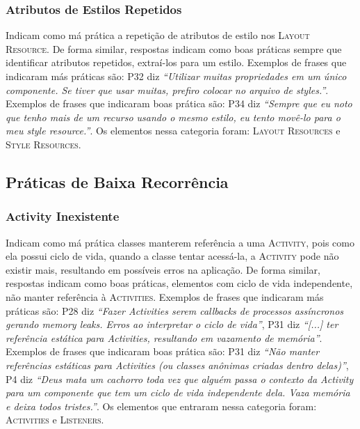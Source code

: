 \subsubsection{Atributos de Estilos Repetidos}
Indicam como má prática a repetição de atributos de estilo nos \textsc{Layout Resource}. De forma similar, respostas indicam como boas práticas sempre que identificar atributos repetidos, extraí-los para um estilo. Exemplos de frases que indicaram más práticas são: P32 diz \textit{``Utilizar muitas propriedades em um único componente. Se tiver que usar muitas, prefiro colocar no arquivo de styles.''}. Exemplos de frases que indicaram boas prática são: P34 diz \textit{``Sempre que eu noto que tenho mais de um recurso usando o mesmo estilo, eu tento movê-lo para o meu \textit{style resource}.''}. Os elementos nessa categoria foram: \textsc{Layout Resources} e \textsc{Style Resources}.



\subsection{Práticas de Baixa Recorrência}


\subsubsection{Activity Inexistente}
Indicam como má prática classes manterem referência a uma \textsc{Activity}, pois como ela possui ciclo de vida, quando a classe tentar acessá-la, a \textsc{Activity} pode não existir mais, resultando em possíveis erros na aplicação. De forma similar, respostas indicam como boas práticas, elementos com ciclo de vida independente, não manter referência à \textsc{Activities}. Exemplos de frases que indicaram más práticas são: P28 diz \textit{``Fazer Activities serem callbacks de processos assíncronos gerando memory leaks. Erros ao interpretar o ciclo de vida''}, P31 diz \textit{``[...] ter referência estática para Activities, resultando em vazamento de memória''}. Exemplos de frases que indicaram boas prática são: P31 diz \textit{``Não manter referências estáticas para Activities (ou classes an\^onimas criadas dentro delas)''}, P4 diz \textit{``Deus mata um cachorro toda vez que alguém passa o contexto da Activity para um componente que tem um ciclo de vida independente dela. Vaza memória e deixa todos tristes.''}. Os elementos que entraram nessa categoria foram: \textsc{Activities} e \textsc{Listeners}. 

